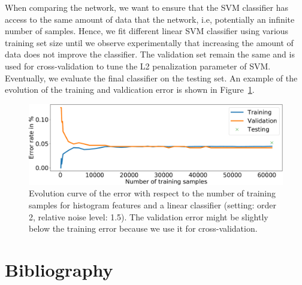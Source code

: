 \documentclass[final,twocolumn,3p,times,authoryear]{elsarticle}
\newcommand{\figref}[1]{Figure~\ref{fig:#1}}
\newcommand{\1}{\b{1}}              %
\newcommand{\0}{\b{0}}              %
\begin{document}
When comparing the network, we want to ensure that the SVM classifier has
access to the same amount of data that the network, i.e, potentially an
infinite number of samples. Hence, we fit different linear SVM classifier using
various training set size until we observe experimentally that
increasing the amount of data does not improve the classifier. The validation
set remain the same and is used for cross-validation to tune the L2
penalization parameter of SVM. Eventually, we evaluate the final classifier on
the testing set. An example of the evolution of the training and valdication
error is shown in \figref{hist_error_evolution}.

\begin{figure}[!ht]
\centering
\includegraphics[width=\linewidth]{hist_error_order2_noise1_5}
\caption{Evolution curve of the error with respect to the number of training samples for histogram features and a linear classifier (setting: order 2, relative noise level: 1.5). The validation error might be slightly below the training error because we use it for cross-validation.}
\label{fig:hist_error_evolution}
\end{figure}

\section*{Bibliography}


\end{document}

